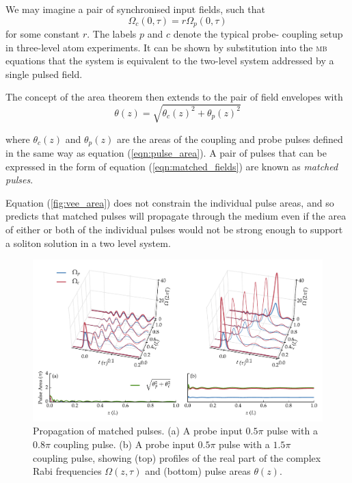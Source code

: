     We may imagine a pair of synchronised input fields, such that
    \begin{equation}
      \Omega_c(0, \tau) = r \Omega_p(0, \tau)
      \label{eqn:matched_fields}
    \end{equation}
    for some constant $r$. The labels $p$ and $c$ denote the typical probe-
    coupling setup in three-level atom experiments. It can be
    shown\cite{Rahman1998} by substitution into the \textsc{mb} equations that
    the system is equivalent to the two-level system addressed by a single
    pulsed field.

    The concept of the area theorem then extends to the pair of field envelopes
    with
    \begin{equation}
      \theta(z) = \sqrt{\theta_c(z)^2 + \theta_p(z)^2}
      \label{fig:vee_area}
      \end{equation}

    where $\theta_c(z)$ and $\theta_p(z)$ are the areas of the coupling and
    probe pulses defined in the same way as equation (\ref{eqn:pulse_area}). A
    pair of pulses that can be expressed in the form of equation
    (\ref{eqn:matched_fields}) are known as \textit{matched pulses}.

    Equation (\ref{fig:vee_area}) does not constrain the individual pulse areas,
    and so predicts that matched pulses will propagate through the medium even
    if the area of either or both of the individual pulses would not be strong
    enough to support a soliton solution in a two level system.

    \begin{figure}[h]
      \includegraphics[width=\linewidth]
        {figs/03_nonlinear/mb_vee_sit_05pi_plot_nodecay_fig1.pdf}
      \caption{
      Propagation of matched pulses. (a) A probe input $0.5 \pi$ pulse with a
      $0.8 \pi$ coupling pulse. (b) A probe input $0.5 \pi$ pulse with a $1.5
      \pi$ coupling pulse, showing (top) profiles of the real part of the
      complex Rabi frequencies $\Omega(z, \tau)$ and (bottom) pulse areas
      $\theta(z)$.
      }
      \label{fig:vee_simultons}
    \end{figure}    

